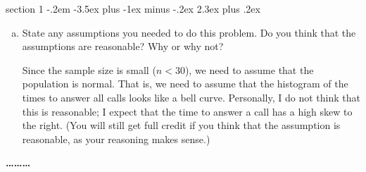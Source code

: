 \documentclass[answers,11pt]{exam}
\makeatletter
\newenvironment{problem}{\@startsection
       {section}
       {1}
       {-.2em}
       {-3.5ex plus -1ex minus -.2ex}
       {2.3ex plus .2ex}
       {\pagebreak[3]%
       \large\bf\noindent{Problem }
       }
       }
       {%
       \begin{center}\large\bf \ldots\ldots\ldots\end{center}}
\makeatother
\begin{document}
\begin{problem}{}
\begin{enumerate}[(a)]
\item State any assumptions you needed to do this problem. Do you think that
the assumptions are reasonable? Why or why not?
    \begin{solution}
Since the sample size is small ($n < 30$), we need to assume that the
population is normal.  That is, we need to assume that the histogram of the
times to answer all calls looks like a bell curve.  Personally, I do not think
that this is reasonable; I expect that the time to answer a call has a high
skew to the right.  (You will still get full credit if you think that the
assumption is reasonable, as your reasoning makes sense.)
    \end{solution}

\end{enumerate}

\end{problem}
\end{document}
